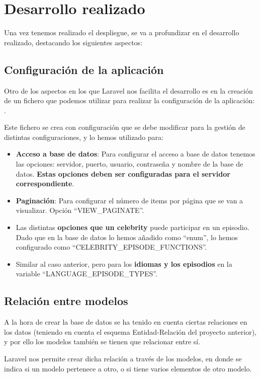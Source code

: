 \documentclass{\ClassPath/viu-tfm-template}
\begin{document}
\chapter{Desarrollo realizado}

Una vez tenemos realizado el despliegue, se va a profundizar en el desarrollo realizado, destacando los siguientes aspectos:

\section{Configuración de la aplicación}
Otro de los aspectos en los que Laravel nos facilita el desarrollo es en la creación de un fichero que podemos utilizar para realizar la configuración de la aplicación: .

Este fichero se crea con configuración que se debe modificar para la gestión de distintas configuraciones, y lo hemos utilizado para:
\vspace{-1em}
\begin{itemize}
    \item \textbf{Acceso a base de datos}: Para configurar el acceso a base de datos tenemos las opciones: servidor, puerto, usuario, contraseña y nombre de la base de datos. \textbf{Estas opciones deben ser configuradas para el servidor correspondiente}.
    \item \textbf{Paginación}: Para configurar el número de items por página que se van a visualizar. Opción “VIEW\_PAGINATE”.
    \item Las distintas \textbf{opciones que un celebrity} puede participar en un episodio. Dado que en la base de datos lo hemos añadido como “enum”, lo hemos configurado como “CELEBRITY\_EPISODE\_FUNCTIONS”.
    \item Similar al caso anterior, pero para los \textbf{idiomas y los episodios} en la variable “LANGUAGE\_EPISODE\_TYPES”.
\end{itemize}
\vspace{-1em}

\section{Relación entre modelos}
A la hora de crear la base de datos se ha tenido en cuenta ciertas relaciones en los datos (teniendo en cuenta el esquema Entidad-Relación del proyecto anterior), y por ello los modelos también se tienen que relacionar entre sí.

Laravel nos permite crear dicha relación a través de los modelos, en donde se indica si un modelo pertenece a otro, o si tiene varios elementos de otro modelo.
\end{document}
